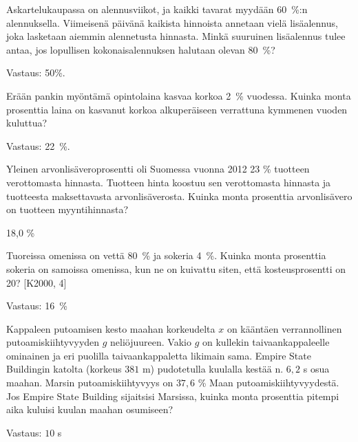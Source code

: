 \begin{tehtava}
    Askartelukaupassa on alennusviikot, ja kaikki tavarat myydään 60~\%:n alennuksella. Viimeisenä päivänä kaikista hinnoista annetaan 
    vielä lisäalennus, joka lasketaan aiemmin alennetusta hinnasta. Minkä suuruinen lisäalennus tulee antaa, jos lopullisen 
    kokonaisalennuksen halutaan olevan 80~\%?

    \begin{vastaus}
        Vastaus: 50\%.
    \end{vastaus}
\end{tehtava}

\begin{tehtava}
    Erään pankin myöntämä opintolaina kasvaa korkoa 2~\% vuodessa. Kuinka monta prosenttia laina on kasvanut korkoa alkuperäiseen 
    verrattuna kymmenen vuoden kuluttua?

    \begin{vastaus}
        Vastaus: 22~\%.
    \end{vastaus}
\end{tehtava}

\begin{tehtava}
Yleinen arvonlisäveroprosentti oli Suomessa vuonna 2012 23 \% tuotteen verottomasta
hinnasta. Tuotteen hinta koostuu sen verottomasta hinnasta
ja tuotteesta maksettavasta arvonlisäverosta. Kuinka monta
prosenttia arvonlisävero on tuotteen myyntihinnasta?
\begin{vastaus}
18,0 \%
\end{vastaus}
\end{tehtava}


\begin{tehtava}
    Tuoreissa omenissa on vettä 80~\% ja sokeria 4~\%. Kuinka monta prosenttia sokeria on samoissa omenissa, kun ne on kuivattu siten, 
    että kosteusprosentti on 20? [K2000, 4]
    
    \begin{vastaus}
        Vastaus: 16~\%
    \end{vastaus}
\end{tehtava}

\begin{tehtava}
    Kappaleen putoamisen kesto maahan korkeudelta $x$ on kääntäen verrannollinen putoamiskiihtyvyyden $g$ neliöjuureen. Vakio $g$ on kullekin     
    taivaankappaleelle ominainen ja eri puolilla taivaankappaletta likimain sama. Empire State Buildingin katolta (korkeus 
    $381$ m) pudotetulla kuulalla kestää n. $6,2$ s osua maahan. Marsin putoamiskiihtyvyys on $37,6$ \% Maan putoamiskiihtyvyydestä. 
    Jos Empire State Building sijaitsisi Marsissa, kuinka monta prosenttia pitempi aika kuluisi kuulan maahan osumiseen?

    \begin{vastaus}
        Vastaus: $10$ s
    \end{vastaus}
\end{tehtava}
